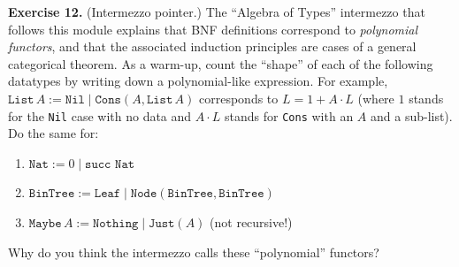 \documentclass[11pt]{article}
\begin{document}
\bigskip
\textbf{Exercise 12.}\label{ex:m10:12} (Intermezzo pointer.) The ``Algebra of Types'' intermezzo that follows this module explains that BNF definitions correspond to \emph{polynomial functors}, and that the associated induction principles are cases of a general categorical theorem. As a warm-up, count the ``shape'' of each of the following datatypes by writing down a polynomial-like expression. For example, $\texttt{List}\,A := \texttt{Nil} \mid \texttt{Cons}(A, \texttt{List}\,A)$ corresponds to $L = 1 + A \cdot L$ (where $1$ stands for the \texttt{Nil} case with no data and $A \cdot L$ stands for \texttt{Cons} with an $A$ and a sub-list). Do the same for:
\begin{enumerate}[label=(\alph*)]
  \item $\texttt{Nat} := 0 \mid \texttt{succ Nat}$
  \item $\texttt{BinTree} := \texttt{Leaf} \mid \texttt{Node}(\texttt{BinTree}, \texttt{BinTree})$
  \item $\texttt{Maybe}\,A := \texttt{Nothing} \mid \texttt{Just}(A)$ (not recursive!)
\end{enumerate}
Why do you think the intermezzo calls these ``polynomial'' functors?
\end{document}
